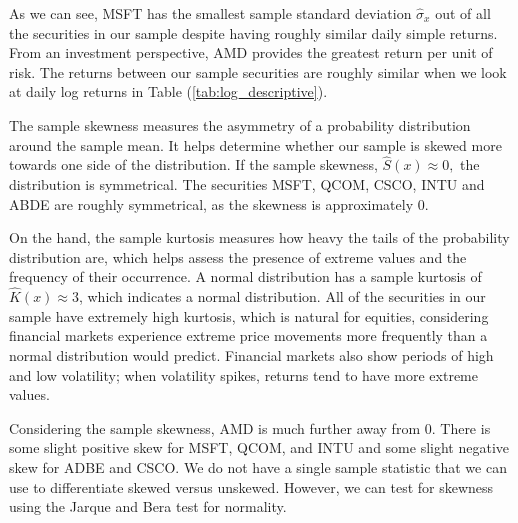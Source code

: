 \documentclass[12pt]{article}
\begin{document}
As we can see, MSFT has the smallest sample standard deviation $\hat{\sigma}_x$ out of all the securities in our sample despite having roughly similar daily simple returns. From an investment perspective, AMD provides the greatest return per unit of risk. The returns between our sample securities are roughly similar when we look at daily log returns in Table (\ref{tab:log_descriptive}).

The sample skewness measures the asymmetry of a probability distribution around the sample mean. It helps determine whether our sample is skewed more towards one side of the distribution. If the sample skewness, $\hat{S}(x)\approx 0,$ the distribution is symmetrical. The securities MSFT, QCOM, CSCO, INTU and ABDE are roughly symmetrical, as the skewness is approximately 0. 

On the hand, the sample kurtosis measures how heavy the tails of the probability distribution are, which helps assess the presence of extreme values and the frequency of their occurrence. A normal distribution has a sample kurtosis of  $\hat{K}(x)\approx 3$, which indicates a normal distribution. All of the securities in our sample have extremely high kurtosis, which is natural for equities, considering financial markets experience extreme price movements more frequently than a normal distribution would predict. Financial markets also show periods of high and low volatility; when volatility spikes, returns tend to have more extreme values.

Considering the sample skewness, AMD is much further away from 0. There is some slight positive skew for MSFT, QCOM, and INTU and some slight negative skew for ADBE and CSCO. We do not have a single sample statistic that we can use to differentiate skewed versus unskewed. However, we can test for skewness using the Jarque and Bera test for normality.
\end{document}
